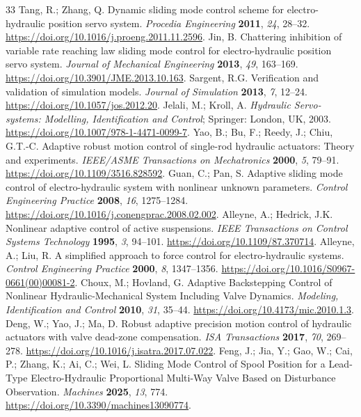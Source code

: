 \begin{thebibliography}{33}
 Tang, R.; Zhang, Q. Dynamic sliding mode control scheme for electro-hydraulic position servo system. \emph{Procedia Engineering} \textbf{2011}, \emph{24}, 28--32. \url{https://doi.org/10.1016/j.proeng.2011.11.2596}.
 Jin, B. Chattering inhibition of variable rate reaching law sliding mode control for electro-hydraulic position servo system. \emph{Journal of Mechanical Engineering} \textbf{2013}, \emph{49}, 163--169. \url{https://doi.org/10.3901/JME.2013.10.163}.
 Sargent, R.G. Verification and validation of simulation models. \emph{Journal of Simulation} \textbf{2013}, \emph{7}, 12--24. \url{https://doi.org/10.1057/jos.2012.20}.
 Jelali, M.; Kroll, A. \emph{Hydraulic Servo-systems: Modelling, Identification and Control}; Springer: London, UK, 2003. \url{https://doi.org/10.1007/978-1-4471-0099-7}.
 Yao, B.; Bu, F.; Reedy, J.; Chiu, G.T.-C. Adaptive robust motion control of single-rod hydraulic actuators: Theory and experiments. \emph{IEEE/ASME Transactions on Mechatronics} \textbf{2000}, \emph{5}, 79--91. \url{https://doi.org/10.1109/3516.828592}.
 Guan, C.; Pan, S. Adaptive sliding mode control of electro-hydraulic system with nonlinear unknown parameters. \emph{Control Engineering Practice} \textbf{2008}, \emph{16}, 1275--1284. \url{https://doi.org/10.1016/j.conengprac.2008.02.002}.
 Alleyne, A.; Hedrick, J.K. Nonlinear adaptive control of active suspensions. \emph{IEEE Transactions on Control Systems Technology} \textbf{1995}, \emph{3}, 94--101. \url{https://doi.org/10.1109/87.370714}.
 Alleyne, A.; Liu, R. A simplified approach to force control for electro-hydraulic systems. \emph{Control Engineering Practice} \textbf{2000}, \emph{8}, 1347--1356. \url{https://doi.org/10.1016/S0967-0661(00)00081-2}.
 Choux, M.; Hovland, G. Adaptive Backstepping Control of Nonlinear Hydraulic-Mechanical System Including Valve Dynamics. \emph{Modeling, Identification and Control} \textbf{2010}, \emph{31}, 35--44. \url{https://doi.org/10.4173/mic.2010.1.3}.
 Deng, W.; Yao, J.; Ma, D. Robust adaptive precision motion control of hydraulic actuators with valve dead-zone compensation. \emph{ISA Transactions} \textbf{2017}, \emph{70}, 269--278. \url{https://doi.org/10.1016/j.isatra.2017.07.022}.
 Feng, J.; Jia, Y.; Gao, W.; Cai, P.; Zhang, K.; Ai, C.; Wei, L. Sliding Mode Control of Spool Position for a Lead-Type Electro-Hydraulic Proportional Multi-Way Valve Based on Disturbance Observation. \emph{Machines} \textbf{2025}, \emph{13}, 774. \url{https://doi.org/10.3390/machines13090774}.

\end{thebibliography}
